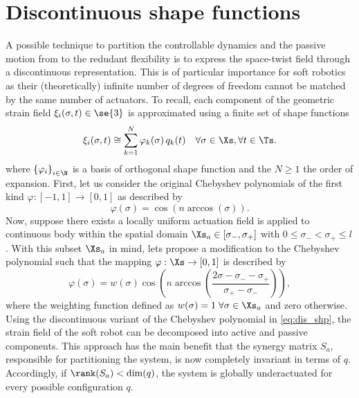 \section{Discontinuous shape functions}
A possible technique to partition the controllable dynamics and the passive motion from to the redudant flexibility is to express the space-twist field through a discontinuous representation. This is of particular importance for soft robotics as their (theoretically) infinite number of degrees of freedom cannot be matched by the same number of actuators. To recall, each component of the geometric strain field $\xi_i(\sigma,t) \in \se{3}$ is approximated using a finite set of shape functions 
%
\begin{equation}
\xi_i(\sigma,t) \cong \sum^N_{k=1} \varphi_k(\sigma)\, q_k(t) \quad \forall \sigma \in \Xs, \forall t\in \Ts.
\end{equation}
%
where $\left\{\varphi_i \right\}_{i\in \N}$ is a basis of orthogonal shape function and the $N \ge 1$ the order of expansion. First, let us consider the original Chebyshev polynomials of the first kind $\varphi: [-1,1] \to [0,1]$ as described by
%
\begin{equation}
\varphi(\sigma) =  \cos\left(n \arccos(\sigma) \right). 
\end{equation}
%
Now, suppose there exists a locally uniform actuation field is applied to continuous body within the spatial domain $\Xs_a \in [\sigma_{-},\sigma_{+}]$ with $0\le\sigma_{-}<\sigma_{+}\le l$. With this subset $\Xs_a$ in mind, lets propose a modification to the Chebyshev polynomial such that the mapping $\varphi: \Xs \to [0,1]$ is described by
%
\begin{equation}
\varphi(\sigma) =  w(\sigma) \cos\left(n \arccos\left(\dfrac{2\sigma - \sigma_{-} - \sigma_{+}}{\sigma_{+} - \sigma_{-}}\right) \right), \label{eq:dis_shp}
\end{equation}
%
where the weighting function defined as $w(\sigma) = 1 \; \forall \sigma \in \Xs_a$ and zero otherwise. Using the discontinuous variant of the Chebyshev polynomial in \eqref{eq:dis_shp}, the strain field of the soft robot can be decomposed into active and passive components. This approach has the main benefit that the synergy matrix $S_a$, responsible for partitioning the system, is now completely invariant in terms of $q$. Accordingly, if $\rank(S_a) < \dim(q)$, the system is globally underactuated for every possible configuration $q$.

